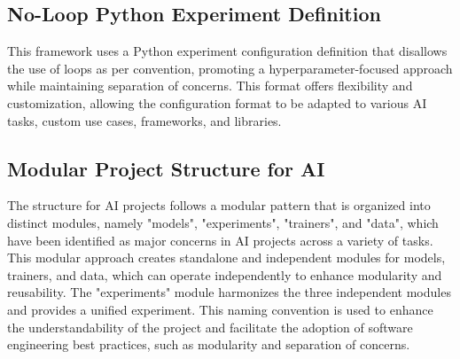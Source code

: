 \subsection{No-Loop Python Experiment Definition}

This framework uses a Python experiment configuration definition that disallows the use of loops as per convention, promoting a hyperparameter-focused approach while maintaining separation of concerns. This format offers flexibility and customization, allowing the configuration format to be adapted to various AI tasks, custom use cases, frameworks, and libraries.







\subsection{Modular Project Structure for AI}

The structure for AI projects follows a modular pattern that is organized into distinct modules, namely "models", "experiments", "trainers", and "data", which have been identified as major concerns in AI projects across a variety of tasks. This modular approach creates standalone and independent modules for models, trainers, and data, which can operate independently to enhance modularity and reusability. The "experiments" module harmonizes the three independent modules and provides a unified experiment. This naming convention is used to enhance the understandability of the project and facilitate the adoption of software engineering best practices, such as modularity and separation of concerns.

